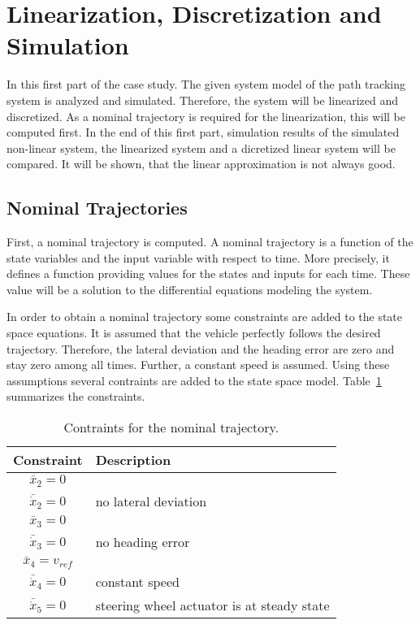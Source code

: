 
\section{Linearization, Discretization and Simulation}
In this first part of the case study. The given system model of the path tracking system is analyzed and simulated.
Therefore, the system will be linearized and discretized. 
As a nominal trajectory is required for the linearization, this will be computed first.
In the end of this first part, simulation results of the simulated non-linear system, the linearized system and a dicretized linear system will be compared.
It will be shown, that the linear approximation is not always good.

\subsection{Nominal Trajectories}
First, a nominal trajectory is computed.
A nominal trajectory is a function of the state variables and the input variable with respect to time.
More precisely, it defines a function providing values for the states and inputs for each time.
These value will be a solution to the differential equations modeling the system.

In order to obtain a nominal trajectory some constraints are added to the state space equations.
It is assumed that the vehicle perfectly follows the desired trajectory.
Therefore, the lateral deviation and the heading error are zero and stay zero among all times.
Further, a constant speed is assumed.
Using these assumptions several contraints are added to the state space model.
Table~\ref{tab:nominal_contraints} summarizes the constraints.
\begin{table}[h]
	\centering
	\begin{tabular}{c|l}
	\hline
	\hline
	\textbf{Constraint} & \textbf{Description}\\
	\hline
	$\bar{x}_2 = 0$\\$\bar{\dot{x}}_2 = 0$ & no lateral deviation\\\hline
	$\bar{x}_3 = 0$\\$\bar{\dot{x}}_3 = 0$& no heading error\\\hline
	$\bar{x}_4 = v_{ref}$\\$\bar{\dot{x}}_4 = 0$& constant speed\\\hline
	$\bar{\dot{x}}_5 = 0$ & steering wheel actuator is at steady state\\
	\hline
	\end{tabular}
	\caption{Contraints for the nominal trajectory.}
	\label{tab:nominal_contraints}
\end{table}

